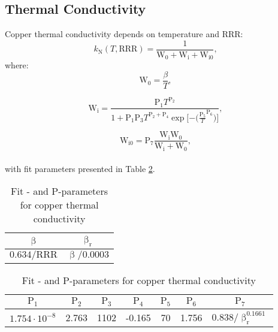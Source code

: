 \subsection{Thermal Conductivity}
Copper thermal conductivity depends on temperature and RRR:
\begin{equation}
    k_\text{N}(T, \text{RRR}) = \frac{1}{\text{W}_\text{0} + \text{W}_\text{i} + \text{W}_\text{i0}}, 
\end{equation}
where:
\begin{equation}
    \text{W}_\text{0} = \frac{\beta}{T},
\end{equation}

\begin{equation}
    \text{W}_\text{i} = \frac{\text{P}_\text{1} T^{\text{P}_\text{2}}}{1+\text{P}_\text{1}  \text{P}_\text{3}  T^{\text{P}_\text{2} + \text{P}_\text{4}}  \exp{[-(\frac{\text{P}_\text{5}}{T}}^{\text{P}_\text{6}})]},
\end{equation}

\begin{equation}
    \text{W}_\text{i0} = \text{P}_\text{7} \frac{\text{W}_\text{i} \text{W}_\text{0}}{\text{W}_\text{i} + \text{W}_\text{0}},
\end{equation}
\\
with fit parameters presented in Table \ref{table:nist_cu_k_parameters}.

\begin{table}[H]
    \caption{Fit \textbeta- and P-parameters for copper thermal conductivity} 
    \vspace{-1.em} 
    \fontsize{10}{10}
    \selectfont 
    \renewcommand{\arraystretch}{1.5}
    \begin{center}
    \begin{tabular}{ cc }  
    $\upbeta$ & $\upbeta_\text{r}$ \\
    \hline
    $0.634/\text{RRR}$ & $\upbeta/0.0003$ \\
    \hline
    \end{tabular}
    
    \begin{tabular}{ ccccccc }  
    $\text{P}_1$ & $\text{P}_2$ & $\text{P}_3$ & $\text{P}_4$ & $\text{P}_5$ & $\text{P}_6$ & $\text{P}_7$ \\
    \hline
    $1.754\cdot10^{-8}$ & 2.763 & 1102 & -0.165 & 70 & 1.756 & $0.838/\upbeta_\text{r}^{0.1661}$ \\
    \hline 
    \end{tabular}
    \end{center}  
     \label{table:nist_cu_k_parameters} 
 \end{table}
 
